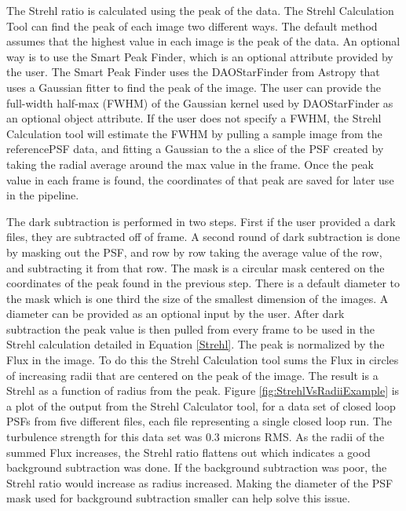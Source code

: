 \documentclass[12pt]{spieman}  %
\begin{document}
\begin{spacing}{2}
The Strehl ratio is calculated using the peak of the data. The Strehl Calculation Tool can find the peak of each image two different ways. The default method assumes that the highest value in each image is the peak of the data. An optional way is to use the Smart Peak Finder, which is an optional attribute provided by the user. The Smart Peak Finder uses the DAOStarFinder from Astropy that uses a Gaussian fitter to find the peak of the image. The user can provide the full-width half-max (FWHM) of the Gaussian kernel used by DAOStarFinder as an optional object attribute. If the user does not specify a FWHM, the Strehl Calculation tool will estimate the FWHM by pulling a sample image from the referencePSF data, and fitting a Gaussian to the a slice of the PSF created by taking the radial average around the max value in the frame. Once the peak value in each frame is found, the coordinates of that peak are saved for later use in the pipeline. 

The dark subtraction is performed in two steps. First if the user provided a dark files, they are subtracted off of frame. A second round of dark subtraction is done by masking out the PSF, and row by row taking the average value of the row, and subtracting it from that row. The mask is a circular mask centered on the coordinates of the peak found in the previous step. There is a default diameter to the mask which is one third the size of the smallest dimension of the images. A diameter can be provided as an optional input by the user. After dark subtraction the peak value is then pulled from every frame to be used in the Strehl calculation detailed in Equation \ref{Strehl}. The peak is normalized by the Flux in the image. To do this the Strehl Calculation tool sums the Flux in circles of increasing radii that are centered on the peak of the image. The result is a Strehl as a function of radius from the peak. Figure \ref{fig:StrehlVsRadiiExample} is a plot of the output from the Strehl Calculator tool, for a data set of closed loop PSFs from five different files, each file representing a single closed loop run. The turbulence strength for this data set was 0.3 microns RMS. As the radii of the summed Flux increases, the Strehl ratio flattens out which indicates a good background subtraction was done. If the background subtraction was poor, the Strehl ratio would increase as radius increased. Making the diameter of the PSF mask used for background subtraction smaller can help solve this issue. 


\end{spacing}
\end{document}
